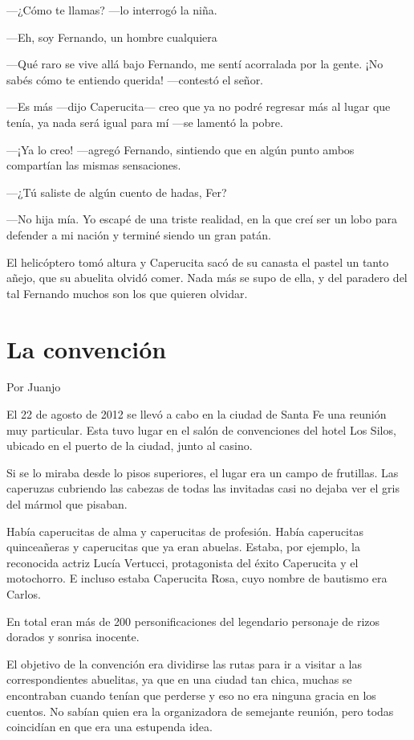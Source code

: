 \documentclass[11pt,twoside,openright,a5paper]{book}
\begin{document}
---¿Cómo te llamas? ---lo interrogó la niña.

---Eh, soy Fernando, un hombre cualquiera

---Qué raro se vive allá bajo Fernando, me sentí acorralada por la gente. ¡No sabés cómo  te entiendo querida! ---contestó el señor.

---Es más ---dijo Caperucita--- creo que ya no podré regresar más al lugar que tenía, ya nada será igual para mí ---se lamentó la pobre.

---¡Ya lo creo! ---agregó Fernando, sintiendo que en algún punto ambos compartían las mismas sensaciones.

---¿Tú saliste de algún cuento de hadas, Fer?

---No hija mía. Yo escapé de una triste realidad, en la que creí ser un lobo para defender a mi nación y terminé siendo un gran patán.

El helicóptero tomó altura y Caperucita sacó de su canasta el pastel un tanto añejo, que su abuelita olvidó comer. Nada más se supo de ella, y del paradero del tal Fernando muchos son los que quieren olvidar.

\section*{La convención}

\begin{flushright}Por Juanjo\end{flushright}

El 22 de agosto de 2012 se llevó a cabo en la ciudad de Santa Fe una reunión muy particular. Esta tuvo lugar en el salón de convenciones del hotel Los Silos, ubicado en el puerto de la ciudad, junto al casino.

Si se lo miraba desde lo pisos superiores, el lugar era un campo de frutillas. Las caperuzas cubriendo las cabezas de todas las invitadas casi no dejaba ver el gris del mármol que pisaban.

Había caperucitas de alma y caperucitas de profesión. Había caperucitas quinceañeras y caperucitas que ya eran abuelas.
Estaba, por ejemplo, la reconocida actriz Lucía Vertucci, protagonista del éxito Caperucita y el motochorro. E incluso estaba Caperucita Rosa, cuyo nombre de bautismo era Carlos.

En total eran más de 200 personificaciones del legendario personaje de rizos dorados y sonrisa inocente.

El objetivo de la convención era dividirse las rutas para ir a visitar a las correspondientes abuelitas, ya que en una ciudad tan chica, muchas se encontraban cuando tenían que perderse y eso no era ninguna gracia en los cuentos. No sabían quien era la organizadora de semejante reunión, pero todas coincidían en que era una estupenda idea.
\end{document}
